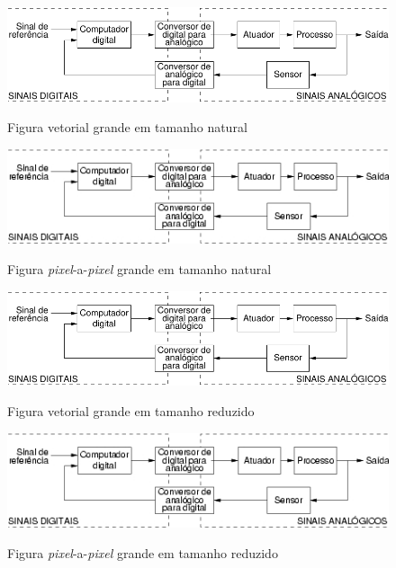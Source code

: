 \begin{figure}[htbp!] \begin{center}
\includegraphics{textuais/04-problema/figuras/bigvetorial}
\caption{Figura vetorial grande em tamanho natural}
\vspace{6mm}
\label{Fig:bigvetorial}
\includegraphics{textuais/04-problema/figuras/bigbitmap}
\caption{Figura \emph{pixel}-a-\emph{pixel} grande em tamanho natural}
\label{Fig:bigbitmap}
\vspace{6mm}
\includegraphics[scale=0.5]{textuais/04-problema/figuras/bigvetorial}
\caption{Figura vetorial grande em tamanho reduzido}
\label{Fig:bigvetorialreduzida}
\vspace{6mm}
\includegraphics[scale=0.5]{textuais/04-problema/figuras/bigbitmap}
\caption{Figura \emph{pixel}-a-\emph{pixel} grande em tamanho reduzido}
\label{Fig:bigbitmapreduzida}
\end{center} \end{figure}

